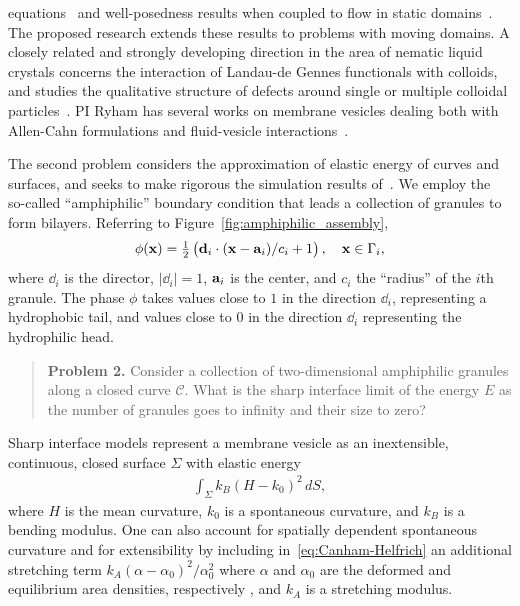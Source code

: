 equations~\cite{Christlieb2019CompetitionAC, Gavish2011CurvatureDF,
Dai2019WeakSF, Promislow2017ExistenceBA, Dai2015CompetitiveGE,
Promislow2012CriticalPO, Dai2022GeometricEO, Dai2020MinimizersFT,
Dai2013GeometricEO, Promislow2022UndulatedBI, Gera2017CahnHilliardOS}
and well-posedness
results when coupled to flow in static domains~\cite{Jiang2017TwophaseIF,
Liu2012StrongSF, Giorgini2019WellPosednessOA, Wu2022WellposednessOA,
Gal2010AsymptoticBO, Giorgini2020DiffuseIM, Giorgini2019UniquenessAR}.
The proposed research extends these results to problems with moving
domains. A closely related and strongly developing direction in the area
of nematic liquid crystals concerns the interaction of Landau-de Gennes
functionals with colloids, and studies the qualitative structure of
defects around single or multiple colloidal
particles~\cite{doi:10.1098/rsta.2020.0432, Alama2015MinimizersOT,
Alama2021SaturnRD, PhysRevE.96.042702}.
PI Ryham has several works on
membrane vesicles dealing both with Allen-Cahn formulations and
fluid-vesicle interactions~\cite{QiangDu09, RYHAM20112929, RyCoEi12,
Ryham2017OnTV}.

The second problem considers the approximation of elastic energy of
curves and surfaces, and seeks to make rigorous the simulation results
of~\cite{FuQuRyYo22, Fu2018_SIAM}. We employ the so-called
``amphiphilic'' boundary condition that leads a collection of
granules to form bilayers. Referring to
Figure~\ref{fig:amphiphilic_assembly}, 
\begin{align}
\label{eq:amphiphilic_BC}
  \phi(\xx) = \tfrac{1}{2}\left(\dd_i \cdot 
    (\xx - \aa_i)/c_i + 1\right), \quad \xx \in \Gamma_i,
\end{align}
where $\dd_i$ is the director, $|\dd_i| = 1$, $\aa_i$ is the center, and
$c_i$ the ``radius'' of the $i$th granule. The phase $\phi$ takes values
close to $1$ in the direction $\dd_i$, representing a hydrophobic tail,
and values close to $0$ in the direction $\dd_i$ representing the
hydrophilic head.

\begin{quotation}
  \noindent
  \textbf{Problem 2.}
  Consider a collection of two-dimensional amphiphilic granules along a
  closed curve $\mathcal{C}$. What is the sharp interface limit of the
  energy $E$ as the number of granules goes to infinity and their size
  to zero?
\end{quotation}
Sharp interface models represent a membrane vesicle as an
inextensible, continuous, closed surface $\Sigma$ with elastic energy
\begin{align}
  \label{eq:Canham-Helfrich}
  \int_{\Sigma} k_B(H - k_0)^2\, dS,
\end{align}
where $H$ is the mean curvature, $k_0$ is a spontaneous curvature, and
$k_B$ is a bending modulus. One can also account
for spatially dependent spontaneous curvature
\cite{PhysRevE.79.031926,Lowengrub13,mahapatra_saintillan_rangamani_2020}
and for extensibility by
including in~\eqref{eq:Canham-Helfrich} an additional stretching term
$k_A(\alpha - \alpha_0)^2/\alpha_0^2$ where $\alpha$ and $\alpha_0$ are
the deformed and equilibrium area densities, respectively
\cite{chabanon2017}, and $k_A$ is a stretching modulus.

